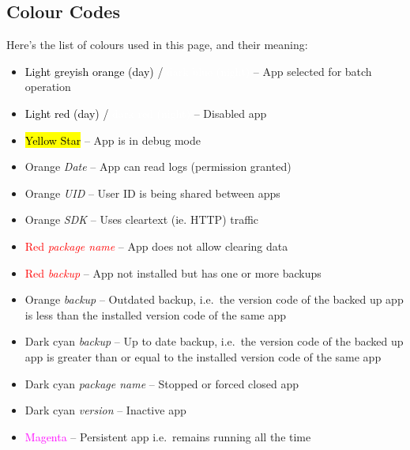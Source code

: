 \subsection{Colour Codes}\label{subsec:main-colour-codes} %
Here's the list of colours used in this page, and their meaning:
\begin{itemize}
    \item \colorbox{AMLightGreyishOrange}{\textcolor{black}{Light greyish orange (day)}} / \colorbox{AMDarkBlue}{
        \textcolor{white}{dark blue (night)}} -- App selected for batch operation
    \item \colorbox{AMLightRed}{\textcolor{black}{Light red (day)}} / \colorbox{AMVeryDarkRed}{
        \textcolor{white}{dark red (night)}} -- Disabled app
    \item \colorbox{yellow}{\textcolor{black}{Yellow Star}} -- App is in debug mode
    \item \textcolor{AMOrange}{Orange \textit{Date}} -- App can read logs (permission granted)
    \item \textcolor{AMOrange}{Orange \textit{UID}} -- User ID is being shared between apps
    \item \textcolor{AMOrange}{Orange \textit{SDK}} -- Uses cleartext (ie. HTTP) traffic
    \item \textcolor{red}{Red \textit{package name}} -- App does not allow clearing data
    \item \textcolor{red}{Red \textit{backup}} -- App not installed but has one or more backups
    \item \textcolor{AMOrange}{Orange \textit{backup}} -- Outdated backup, i.e.\ the version code of the backed up app
        is less than the installed version code of the same app
    \item \textcolor{AMDarkCyan}{Dark cyan \textit{backup}} -- Up to date backup, i.e.\ the version code of the backed
        up app is greater than or equal to the installed version code of the same app
    \item \textcolor{AMDarkCyan}{Dark cyan \textit{package name}} -- Stopped or forced closed app
    \item \textcolor{AMDarkCyan}{Dark cyan \textit{version}} -- Inactive app
    \item \textcolor{magenta}{Magenta} -- Persistent app i.e.\ remains running all the time
\end{itemize}

